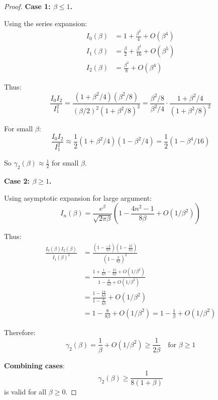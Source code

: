 \begin{proof}
\textbf{Case 1: $\beta \leq 1$.}

Using the series expansion:
\begin{align}
I_0(\beta) &= 1 + \frac{\beta^2}{4} + O(\beta^4) \\
I_1(\beta) &= \frac{\beta}{2} + \frac{\beta^3}{16} + O(\beta^5) \\
I_2(\beta) &= \frac{\beta^2}{8} + O(\beta^4)
\end{align}

Thus:
\begin{equation}
\frac{I_0 I_2}{I_1^2} = \frac{(1 + \beta^2/4)(\beta^2/8)}{(\beta/2)^2(1 + \beta^2/8)^2} 
= \frac{\beta^2/8}{\beta^2/4} \cdot \frac{1 + \beta^2/4}{(1 + \beta^2/8)^2}
\end{equation}

For small $\beta$:
\begin{equation}
\frac{I_0 I_2}{I_1^2} \approx \frac{1}{2}(1 + \beta^2/4)(1 - \beta^2/4) = \frac{1}{2}(1 - \beta^4/16)
\end{equation}

So $\gamma_2(\beta) \approx \frac{1}{2}$ for small $\beta$.

\textbf{Case 2: $\beta \geq 1$.}

Using asymptotic expansion for large argument:
\begin{equation}
I_n(\beta) = \frac{e^\beta}{\sqrt{2\pi\beta}} \left(1 - \frac{4n^2-1}{8\beta} + O(1/\beta^2)\right)
\end{equation}

Thus:
\begin{align}
\frac{I_0(\beta) I_2(\beta)}{I_1(\beta)^2} &= \frac{(1 - \frac{-1}{8\beta})(1 - \frac{15}{8\beta})}{(1 - \frac{3}{8\beta})^2} \\
&= \frac{1 + \frac{1}{8\beta} - \frac{15}{8\beta} + O(1/\beta^2)}{1 - \frac{6}{8\beta} + O(1/\beta^2)} \\
&= \frac{1 - \frac{14}{8\beta}}{1 - \frac{6}{8\beta}} + O(1/\beta^2) \\
&= 1 - \frac{8}{8\beta} + O(1/\beta^2) = 1 - \frac{1}{\beta} + O(1/\beta^2)
\end{align}

Therefore:
\begin{equation}
\gamma_2(\beta) = \frac{1}{\beta} + O(1/\beta^2) \geq \frac{1}{2\beta} \quad \text{for } \beta \geq 1
\end{equation}

\textbf{Combining cases}:
\begin{equation}
\gamma_2(\beta) \geq \frac{1}{8(1 + \beta)}
\end{equation}
is valid for all $\beta \geq 0$.
\end{proof}

